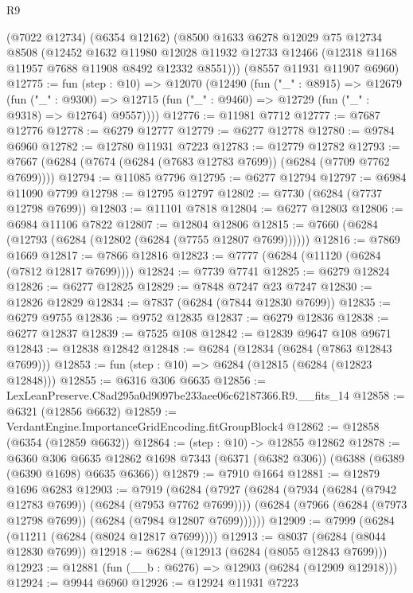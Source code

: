 \begin{lexlean}{R9}
\begin{coremodule}
    (@7022 @12734)
    (@6354 @12162)
    (@8500
      @1633
      @6278
      @12029
      @75
      @12734
      @8508
      (@12452
        @1632
        @11980
        @12028
        @11932
        @12733
        @12466
        (@12318 @1168 @11957 @7688 @11908 @8492 @12332 @8551)))
    (@8557 @11931 @11907 @6960)
@12775 := fun (step : @10) =>
  @12070
    (@12490
      (fun ("_" : @8915) =>
      @12679
        (fun ("_" : @9300) =>
        @12715 (fun ("_" : @9460) => @12729 (fun ("_" : @9318) => @12764) @9557))))
@12776 := @11981 @7712
@12777 := @7687 @12776
@12778 := @6279 @12777
@12779 := @6277 @12778
@12780 := @9784 @6960
@12782 := @12780 @11931 @7223
@12783 := @12779 @12782
@12793 := @7667 (@6284 (@7674 (@6284 (@7683 @12783 @7699)) (@6284 (@7709 @7762 @7699))))
@12794 := @11085 @7796
@12795 := @6277 @12794
@12797 := @6984 @11090 @7799
@12798 := @12795 @12797
@12802 := @7730 (@6284 (@7737 @12798 @7699))
@12803 := @11101 @7818
@12804 := @6277 @12803
@12806 := @6984 @11106 @7822
@12807 := @12804 @12806
@12815 := @7660 (@6284 (@12793 (@6284 (@12802 (@6284 (@7755 @12807 @7699))))))
@12816 := @7869 @1669
@12817 := @7866 @12816
@12823 := @7777 (@6284 (@11120 (@6284 (@7812 @12817 @7699))))
@12824 := @7739 @7741
@12825 := @6279 @12824
@12826 := @6277 @12825
@12829 := @7848 @7247 @23 @7247
@12830 := @12826 @12829
@12834 := @7837 (@6284 (@7844 @12830 @7699))
@12835 := @6279 @9755
@12836 := @9752 @12835
@12837 := @6279 @12836
@12838 := @6277 @12837
@12839 := @7525 @108
@12842 := @12839 @9647 @108 @9671
@12843 := @12838 @12842
@12848 := @6284 (@12834 (@6284 (@7863 @12843 @7699)))
@12853 := fun (step : @10) => @6284 (@12815 (@6284 (@12823 @12848)))
@12855 := @6316 @306 @6635
@12856 := LexLeanPreserve.C8ad295a0d9097be233aee06c62187366.R9.__fits_14
@12858 := @6321 (@12856 @6632)
@12859 := VerdantEngine.ImportanceGridEncoding.fitGroupBlock4
@12862 := @12858 (@6354 (@12859 @6632))
@12864 := (step : @10) -> @12855 @12862
@12878 := @6360
    @306
    @6635
    @12862
    @1698
    @7343
    (@6371 (@6382 @306))
    (@6388 (@6389 (@6390 @1698) @6635 @6366))
@12879 := @7910 @1664
@12881 := @12879 @1696 @6283
@12903 := @7919
    (@6284
      (@7927
        (@6284 (@7934 (@6284 (@7942 @12783 @7699)) (@6284 (@7953 @7762 @7699))))
        (@6284 (@7966 (@6284 (@7973 @12798 @7699)) (@6284 (@7984 @12807 @7699))))))
@12909 := @7999 (@6284 (@11211 (@6284 (@8024 @12817 @7699))))
@12913 := @8037 (@6284 (@8044 @12830 @7699))
@12918 := @6284 (@12913 (@6284 (@8055 @12843 @7699)))
@12923 := @12881 (fun (__b : @6276) => @12903 (@6284 (@12909 @12918)))
@12924 := @9944 @6960
@12926 := @12924 @11931 @7223

\end{coremodule}
\end{lexlean}
